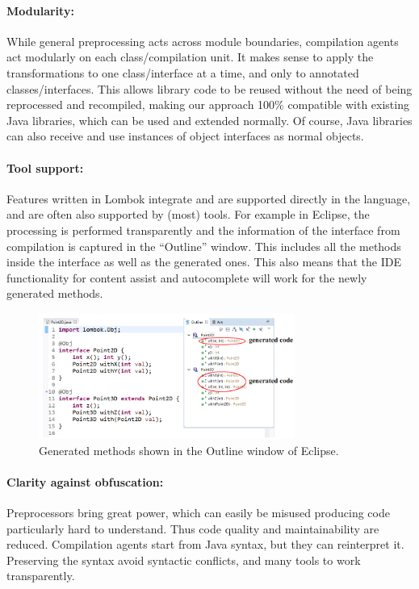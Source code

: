 \paragraph{Modularity:}
While general preprocessing acts across module boundaries, compilation
agents act modularly on each class/compilation unit. It makes sense to
apply the transformations to one class/interface at a time, and only to
annotated classes/interfaces. This allows library code to be reused
without the need of being reprocessed and recompiled, making our
approach 100\% compatible with existing Java libraries, which can be
used and extended normally. Of course, Java libraries can also receive
and use instances of object interfaces as normal objects.

\paragraph{Tool support:}
Features written in Lombok integrate and are supported directly in the
language, and are often also supported by (most) tools.  For example in Eclipse, the processing is
performed transparently and the information of the interface from
compilation is captured in the ``Outline'' window. This includes all
the methods inside the interface as well as the generated ones. 
This also means that the IDE functionality for content assist and
autocomplete will work for the newly generated methods.

\begin{figure}[h]
\centering
\includegraphics[width=3.3in]{pdfs/screenshot2.png}
\caption{Generated methods shown in the Outline window of Eclipse.}
\label{fig:screenshot}
\end{figure}

\paragraph{Clarity against obfuscation:}
Preprocessors bring great power, which can easily be misused producing
code particularly hard to understand. Thus code quality and maintainability are reduced.
Compilation agents start from Java syntax, but they can reinterpret it.
Preserving the syntax avoid syntactic conflicts, and  many
tools to work transparently.


